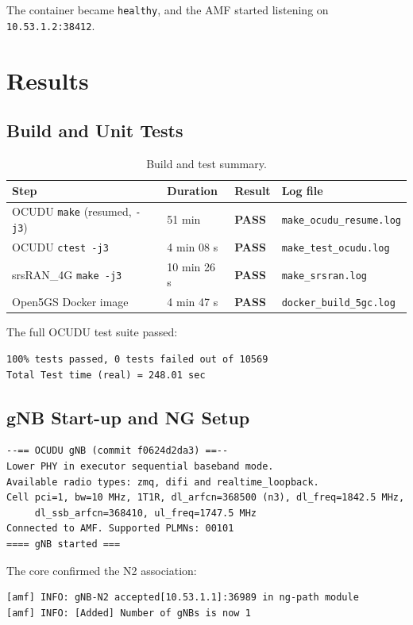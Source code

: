 \documentclass[11pt,a4paper]{article}
\newcommand{\ok}{\textcolor{okgreen}{\textbf{PASS}}}
\newcommand{\fpath}[1]{\texttt{#1}}
\begin{document}
The container became \texttt{healthy}, and the AMF started listening on
\texttt{10.53.1.2:38412}.

\section{Results}

\subsection{Build and Unit Tests}

\begin{table}[H]
\centering
\begin{tabular}{l l l l}
\toprule
Step & Duration & Result & Log file \\
\midrule
OCUDU \texttt{make} (resumed, \texttt{-j3}) & 51 min & \ok & \fpath{make\_ocudu\_resume.log} \\
OCUDU \texttt{ctest -j3}       & 4 min 08 s & \ok & \fpath{make\_test\_ocudu.log} \\
srsRAN\_4G \texttt{make -j3}   & 10 min 26 s & \ok & \fpath{make\_srsran.log} \\
Open5GS Docker image           & 4 min 47 s & \ok & \fpath{docker\_build\_5gc.log} \\
\bottomrule
\end{tabular}
\caption{Build and test summary.}
\end{table}

The full OCUDU test suite passed:
\begin{lstlisting}
100% tests passed, 0 tests failed out of 10569
Total Test time (real) = 248.01 sec
\end{lstlisting}

\subsection{gNB Start-up and NG Setup}

\begin{lstlisting}
--== OCUDU gNB (commit f0624d2da3) ==--
Lower PHY in executor sequential baseband mode.
Available radio types: zmq, difi and realtime_loopback.
Cell pci=1, bw=10 MHz, 1T1R, dl_arfcn=368500 (n3), dl_freq=1842.5 MHz,
     dl_ssb_arfcn=368410, ul_freq=1747.5 MHz
Connected to AMF. Supported PLMNs: 00101
==== gNB started ===
\end{lstlisting}

The core confirmed the N2 association:
\begin{lstlisting}
[amf] INFO: gNB-N2 accepted[10.53.1.1]:36989 in ng-path module
[amf] INFO: [Added] Number of gNBs is now 1
\end{lstlisting}
\end{document}
